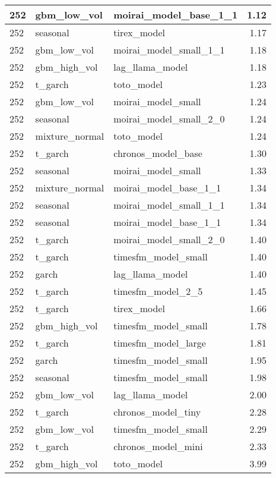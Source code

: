 {\begin{tabular}{lllr}
\midrule
252 & gbm\_low\_vol & moirai\_model\_base\_1\_1 & 1.12 \\
\midrule
252 & seasonal & tirex\_model & 1.17 \\
\midrule
252 & gbm\_low\_vol & moirai\_model\_small\_1\_1 & 1.18 \\
\midrule
252 & gbm\_high\_vol & lag\_llama\_model & 1.18 \\
\midrule
252 & t\_garch & toto\_model & 1.23 \\
\midrule
252 & gbm\_low\_vol & moirai\_model\_small & 1.24 \\
\midrule
252 & seasonal & moirai\_model\_small\_2\_0 & 1.24 \\
\midrule
252 & mixture\_normal & toto\_model & 1.24 \\
\midrule
252 & t\_garch & chronos\_model\_base & 1.30 \\
\midrule
252 & seasonal & moirai\_model\_small & 1.33 \\
\midrule
252 & mixture\_normal & moirai\_model\_base\_1\_1 & 1.34 \\
\midrule
252 & seasonal & moirai\_model\_small\_1\_1 & 1.34 \\
\midrule
252 & seasonal & moirai\_model\_base\_1\_1 & 1.34 \\
\midrule
252 & t\_garch & moirai\_model\_small\_2\_0 & 1.40 \\
\midrule
252 & t\_garch & timesfm\_model\_small & 1.40 \\
\midrule
252 & garch & lag\_llama\_model & 1.40 \\
\midrule
252 & t\_garch & timesfm\_model\_2\_5 & 1.45 \\
\midrule
252 & t\_garch & tirex\_model & 1.66 \\
\midrule
252 & gbm\_high\_vol & timesfm\_model\_small & 1.78 \\
\midrule
252 & t\_garch & timesfm\_model\_large & 1.81 \\
\midrule
252 & garch & timesfm\_model\_small & 1.95 \\
\midrule
252 & seasonal & timesfm\_model\_small & 1.98 \\
\midrule
252 & gbm\_low\_vol & lag\_llama\_model & 2.00 \\
\midrule
252 & t\_garch & chronos\_model\_tiny & 2.28 \\
\midrule
252 & gbm\_low\_vol & timesfm\_model\_small & 2.29 \\
\midrule
252 & t\_garch & chronos\_model\_mini & 2.33 \\
\midrule
252 & gbm\_high\_vol & toto\_model & 3.99 \\

\end{tabular}}
